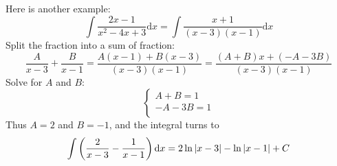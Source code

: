 \documentclass{article}
\numberwithin{equation}{section}
\begin{document}
Here is another example:
\[
\int \frac{2x - 1}{x^2 - 4x + 3} \mathrm{d}x = \int \frac{x + 1}{(x - 3)(x - 1)} \mathrm{d}x
\]
Split the fraction into a sum of fraction:
\[
\frac{A}{x - 3} + \frac{B}{x - 1} = \frac{A(x - 1) + B(x - 3)}{(x - 3)(x - 1)} = \frac{(A+B)x +(-A -3B)}{(x-3)(x-1)}
\]
Solve for $A$ and $B$:
\[
\begin{cases}
    A+B = 1\\
    -A-3B = 1\\
\end{cases}
\]
Thus $A = 2$ and $B = -1$, and the integral turns to 
\[
\int \left(\frac{2}{x-3} - \frac{1}{x-1} \right) \mathrm{d}x = 2\ln\abs{x-3} - \ln\abs{x-1} + C
\]
\end{document}
